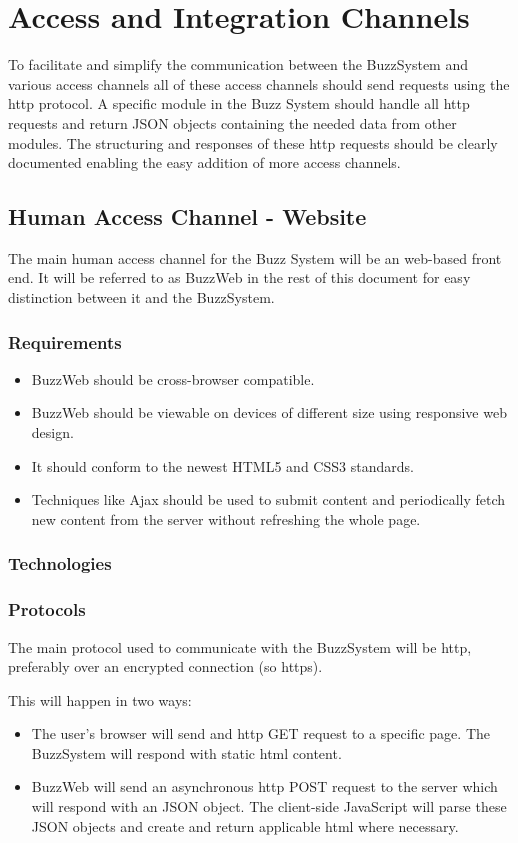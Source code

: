 \section{Access and Integration  Channels}
To facilitate and simplify the communication between the BuzzSystem and various access channels all of these access channels should send requests using the http protocol. A specific module in the Buzz System should handle all http requests and return JSON objects containing the needed data from other modules. The structuring and responses of these http requests should be clearly documented enabling the easy addition of more access channels.

\subsection{Human Access Channel - Website}
The main human access channel for the Buzz System will be an web-based front end. It will be referred to as BuzzWeb in the rest of this document for easy distinction between it and the BuzzSystem.
	\subsubsection{Requirements}
	\begin{itemize}
		\item BuzzWeb should be cross-browser compatible.
		\item BuzzWeb should be viewable on devices of different size using responsive web design.
		\item It should conform to the newest HTML5 and CSS3 standards.
		\item Techniques like Ajax should be used to submit content and periodically fetch new content from the server without refreshing the whole page. 
	\end{itemize}

	\subsubsection{Technologies}
	
		
	\subsubsection{Protocols}
	The main protocol used to communicate with the BuzzSystem will be http, preferably over an encrypted connection (so https). 
	
	This will happen in two ways: 
	\begin{itemize}
	\item The user's browser will send and http GET request to a specific page. The BuzzSystem will respond with static html content.
	\item BuzzWeb will send an asynchronous http POST request to the server which will respond with an JSON object. The client-side JavaScript will parse these JSON objects and create and return applicable html where necessary.
	\end{itemize}

